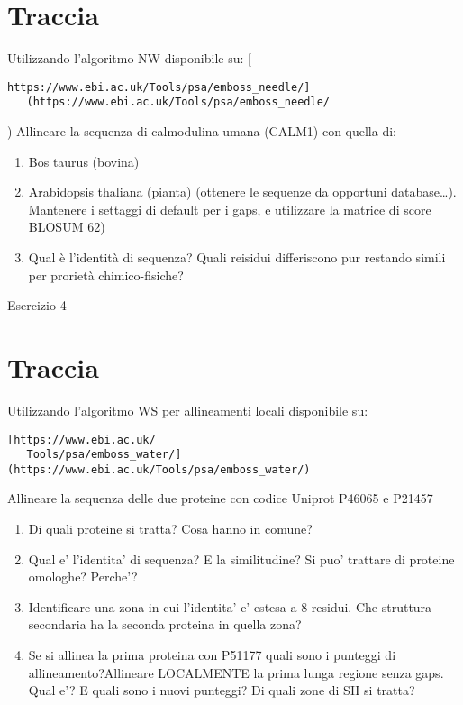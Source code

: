 \documentclass{article}
\begin{document}
\section*{Traccia}
Utilizzando l'algoritmo NW disponibile su: [\begin{verbatim}https://www.ebi.ac.uk/Tools/psa/emboss_needle/]
   (https://www.ebi.ac.uk/Tools/psa/emboss_needle/\end{verbatim})
Allineare la sequenza di calmodulina umana (CALM1) con quella di:
\begin{enumerate}
   \item Bos taurus (bovina)
   \item Arabidopsis thaliana (pianta) (ottenere le sequenze da opportuni database…).
      \subitem Mantenere i settaggi di default per i gaps, e utilizzare la matrice di score BLOSUM 62)
   \item Qual è l'identità di sequenza? Quali reisidui differiscono pur restando simili per prorietà chimico-fisiche?
\end{enumerate}

\begin{center}
   \huge
   Esercizio 4
\end{center}
\section*{Traccia}
Utilizzando l'algoritmo WS per allineamenti locali disponibile su: \begin{verbatim}[https://www.ebi.ac.uk/
   Tools/psa/emboss_water/](https://www.ebi.ac.uk/Tools/psa/emboss_water/)\end{verbatim}
Allineare la sequenza delle due proteine con codice Uniprot P46065 e P21457
\begin{enumerate}
   \item Di quali proteine si tratta? Cosa hanno in comune?
   \item Qual e' l'identita' di sequenza? E la similitudine? Si puo' trattare di proteine omologhe? Perche'?
   \item Identificare una zona in cui l'identita' e' estesa a 8 residui. Che struttura secondaria ha la seconda proteina in quella zona?
   \item Se si allinea la prima proteina con P51177 quali sono i punteggi di allineamento?Allineare LOCALMENTE la prima lunga regione senza gaps. Qual e'? E quali sono i nuovi punteggi? Di quali zone di SII si tratta?
\end{enumerate}
\end{document}
